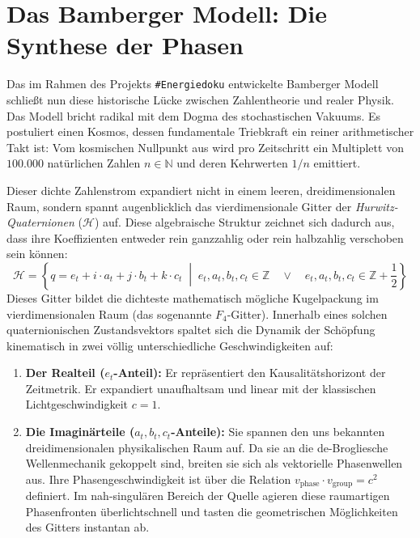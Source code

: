 \documentclass[11pt,a4paper]{article}
\begin{document}
	\section{Das Bamberger Modell: Die Synthese der Phasen}
	Das im Rahmen des Projekts \texttt{\#Energiedoku} entwickelte Bamberger Modell schließt nun diese historische Lücke zwischen Zahlentheorie und realer Physik. Das Modell bricht radikal mit dem Dogma des stochastischen Vakuums. Es postuliert einen Kosmos, dessen fundamentale Triebkraft ein reiner arithmetischer Takt ist: Vom kosmischen Nullpunkt aus wird pro Zeitschritt ein Multiplett von $100.000$ natürlichen Zahlen $n \in \mathbb{N}$ und deren Kehrwerten $1/n$ emittiert.
	
	Dieser dichte Zahlenstrom expandiert nicht in einem leeren, dreidimensionalen Raum, sondern spannt augenblicklich das vierdimensionale Gitter der \textit{Hurwitz-Quaternionen} ($\mathcal{H}$) auf. Diese algebraische Struktur zeichnet sich dadurch aus, dass ihre Koeffizienten entweder rein ganzzahlig oder rein halbzahlig verschoben sein können:
	\begin{equation}
		\mathcal{H} = \left\{ q = e_t + i \cdot a_t + j \cdot b_t + k \cdot c_t \;\middle|\; e_t, a_t, b_t, c_t \in \mathbb{Z} \quad \lor \quad e_t, a_t, b_t, c_t \in \mathbb{Z} + \frac{1}{2} \right\}
	\end{equation}
	Dieses Gitter bildet die dichteste mathematisch mögliche Kugelpackung im vierdimensionalen Raum (das sogenannte $F_4$-Gitter). Innerhalb eines solchen quaternionischen Zustandsvektors spaltet sich die Dynamik der Schöpfung kinematisch in zwei völlig unterschiedliche Geschwindigkeiten auf:
	\begin{enumerate}
		\item \textbf{Der Realteil ($e_t$-Anteil):} Er repräsentiert den Kausalitätshorizont der Zeitmetrik. Er expandiert unaufhaltsam und linear mit der klassischen Lichtgeschwindigkeit $c = 1$.
		\item \textbf{Die Imaginärteile ($a_t, b_t, c_t$-Anteile):} Sie spannen den uns bekannten dreidimensionalen physikalischen Raum auf. Da sie an die de-Brogliesche Wellenmechanik gekoppelt sind, breiten sie sich als vektorielle Phasenwellen aus. Ihre Phasengeschwindigkeit ist über die Relation $v_{\text{phase}} \cdot v_{\text{group}} = c^2$ definiert. Im nah-singulären Bereich der Quelle agieren diese raumartigen Phasenfronten überlichtschnell und tasten die geometrischen Möglichkeiten des Gitters instantan ab.
	\end{enumerate}
	
\end{document}
